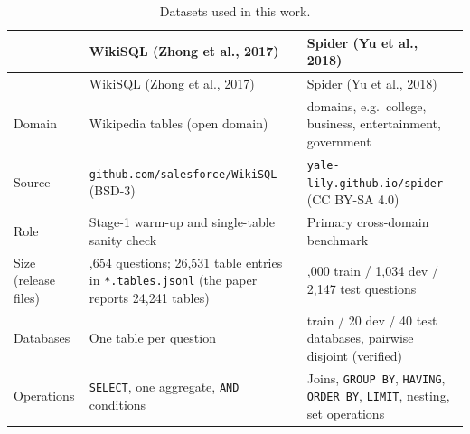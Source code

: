 \documentclass[
  10pt,
]{article}
\begin{document}
\begin{longtable}[]{@{}
  >{\raggedright\arraybackslash}p{}
  >{\raggedright\arraybackslash}p{}
  >{\raggedright\arraybackslash}p{}@{}}
\caption{Datasets used in this work.}\tabularnewline
\toprule\noalign{}
\begin{minipage}[b]{\linewidth}\raggedright
\end{minipage} & \begin{minipage}[b]{\linewidth}\raggedright
WikiSQL (Zhong et al., 2017)
\end{minipage} & \begin{minipage}[b]{\linewidth}\raggedright
Spider (Yu et al., 2018)
\end{minipage} \\
\midrule\noalign{}
\endfirsthead
\toprule\noalign{}
\begin{minipage}[b]{\linewidth}\raggedright
\end{minipage} & \begin{minipage}[b]{\linewidth}\raggedright
WikiSQL (Zhong et al., 2017)
\end{minipage} & \begin{minipage}[b]{\linewidth}\raggedright
Spider (Yu et al., 2018)
\end{minipage} \\
\midrule\noalign{}
\endhead
\bottomrule\noalign{}
\endlastfoot
Domain & Wikipedia tables (open domain) & 138 domains, e.g.~college,
business, entertainment, government \\
Source & \texttt{github.com/salesforce/WikiSQL} (BSD-3) &
\texttt{yale-lily.github.io/spider} (CC BY-SA 4.0) \\
Role & Stage-1 warm-up and single-table sanity check & Primary
cross-domain benchmark \\
Size (release files) & 80,654 questions; 26,531 table entries in
\texttt{*.tables.jsonl} (the paper reports 24,241 tables) & 7,000 train
/ 1,034 dev / 2,147 test questions \\
Databases & One table per question & 140 train / 20 dev / 40 test
databases, pairwise disjoint (verified) \\
Operations & \texttt{SELECT}, one aggregate, \texttt{AND} conditions &
Joins, \texttt{GROUP\ BY}, \texttt{HAVING}, \texttt{ORDER\ BY},
\texttt{LIMIT}, nesting, set operations \\
\end{longtable}
\end{document}
